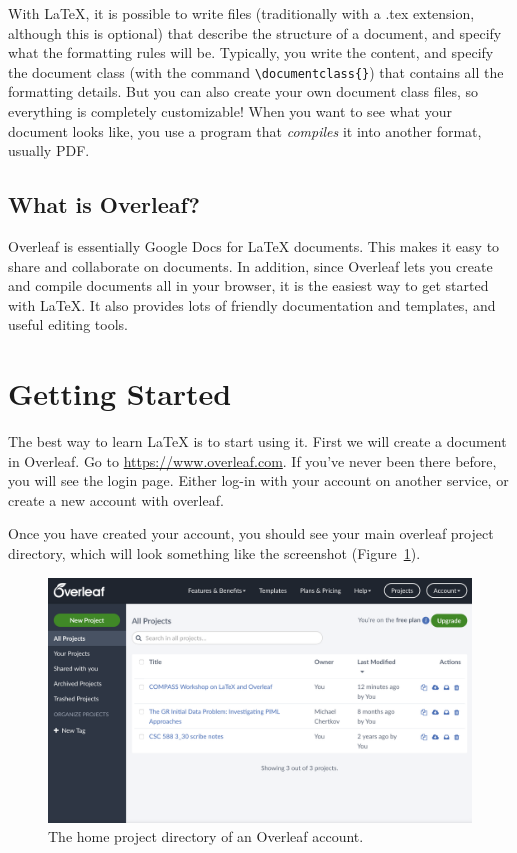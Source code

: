 \documentclass{article}
\begin{document}
With \LaTeX{}, it is possible to write files (traditionally with a .tex extension, although this is optional) that describe the structure of a document, and specify what the formatting rules will be. Typically, you write the content, and specify the document class (with the command \verb|\documentclass{}|) that contains all the formatting details. But you can also create your own document class files, so everything is completely customizable! When you want to see what your document looks like, you use a program that \textit{compiles} it into another format, usually PDF.

\subsection{What is Overleaf?}
Overleaf is essentially Google Docs for \LaTeX{} documents. This makes it easy to share and collaborate on documents. In addition, since Overleaf lets you create and compile documents all in your browser, it is the easiest way to get started with \LaTeX{}. It also provides lots of friendly documentation and templates, and useful editing tools.

\section{Getting Started}
The best way to learn \LaTeX{} is to start using it. First we will create a document in Overleaf. Go to \url{https://www.overleaf.com}. If you've never been there before, you will see the login page. Either log-in with your account on another service, or create a new account with overleaf.

Once you have created your account, you should see your main overleaf project directory, which will look something like the screenshot (Figure~\ref{fig:home}).

\begin{figure}
\centering
\includegraphics[width=0.75\linewidth]{Overleaf_home.png}
\caption{\label{fig:home}The home project directory of an Overleaf account.}
\end{figure}
\end{document}
